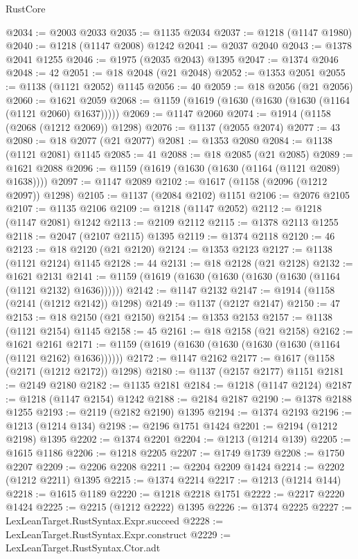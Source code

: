 \begin{lexlean}{RustCore}
\begin{coremodule}
@2034 := @2003 @2033
@2035 := @1135 @2034
@2037 := @1218 (@1147 @1980)
@2040 := @1218 (@1147 @2008) @1242
@2041 := @2037 @2040
@2043 := @1378 @2041 @1255
@2046 := @1975 (@2035 @2043) @1395
@2047 := @1374 @2046
@2048 := 42
@2051 := @18 @2048 (@21 @2048)
@2052 := @1353 @2051
@2055 := @1138 (@1121 @2052) @1145
@2056 := 40
@2059 := @18 @2056 (@21 @2056)
@2060 := @1621 @2059
@2068 := @1159 (@1619 (@1630 (@1630 (@1630 (@1164 (@1121 @2060) @1637)))))
@2069 := @1147 @2060
@2074 := @1914 (@1158 (@2068 (@1212 @2069)) @1298)
@2076 := @1137 (@2055 @2074)
@2077 := 43
@2080 := @18 @2077 (@21 @2077)
@2081 := @1353 @2080
@2084 := @1138 (@1121 @2081) @1145
@2085 := 41
@2088 := @18 @2085 (@21 @2085)
@2089 := @1621 @2088
@2096 := @1159 (@1619 (@1630 (@1630 (@1164 (@1121 @2089) @1638))))
@2097 := @1147 @2089
@2102 := @1617 (@1158 (@2096 (@1212 @2097)) @1298)
@2105 := @1137 (@2084 @2102) @1151
@2106 := @2076 @2105
@2107 := @1135 @2106
@2109 := @1218 (@1147 @2052)
@2112 := @1218 (@1147 @2081) @1242
@2113 := @2109 @2112
@2115 := @1378 @2113 @1255
@2118 := @2047 (@2107 @2115) @1395
@2119 := @1374 @2118
@2120 := 46
@2123 := @18 @2120 (@21 @2120)
@2124 := @1353 @2123
@2127 := @1138 (@1121 @2124) @1145
@2128 := 44
@2131 := @18 @2128 (@21 @2128)
@2132 := @1621 @2131
@2141 := @1159 (@1619 (@1630 (@1630 (@1630 (@1630 (@1164 (@1121 @2132) @1636))))))
@2142 := @1147 @2132
@2147 := @1914 (@1158 (@2141 (@1212 @2142)) @1298)
@2149 := @1137 (@2127 @2147)
@2150 := 47
@2153 := @18 @2150 (@21 @2150)
@2154 := @1353 @2153
@2157 := @1138 (@1121 @2154) @1145
@2158 := 45
@2161 := @18 @2158 (@21 @2158)
@2162 := @1621 @2161
@2171 := @1159 (@1619 (@1630 (@1630 (@1630 (@1630 (@1164 (@1121 @2162) @1636))))))
@2172 := @1147 @2162
@2177 := @1617 (@1158 (@2171 (@1212 @2172)) @1298)
@2180 := @1137 (@2157 @2177) @1151
@2181 := @2149 @2180
@2182 := @1135 @2181
@2184 := @1218 (@1147 @2124)
@2187 := @1218 (@1147 @2154) @1242
@2188 := @2184 @2187
@2190 := @1378 @2188 @1255
@2193 := @2119 (@2182 @2190) @1395
@2194 := @1374 @2193
@2196 := @1213 (@1214 @134)
@2198 := @2196 @1751 @1424
@2201 := @2194 (@1212 @2198) @1395
@2202 := @1374 @2201
@2204 := @1213 (@1214 @139)
@2205 := @1615 @1186
@2206 := @1218 @2205
@2207 := @1749 @1739
@2208 := @1750 @2207
@2209 := @2206 @2208
@2211 := @2204 @2209 @1424
@2214 := @2202 (@1212 @2211) @1395
@2215 := @1374 @2214
@2217 := @1213 (@1214 @144)
@2218 := @1615 @1189
@2220 := @1218 @2218 @1751
@2222 := @2217 @2220 @1424
@2225 := @2215 (@1212 @2222) @1395
@2226 := @1374 @2225
@2227 := LexLeanTarget.RustSyntax.Expr.succeed
@2228 := LexLeanTarget.RustSyntax.Expr.construct
@2229 := LexLeanTarget.RustSyntax.Ctor.adt

\end{coremodule}
\end{lexlean}
